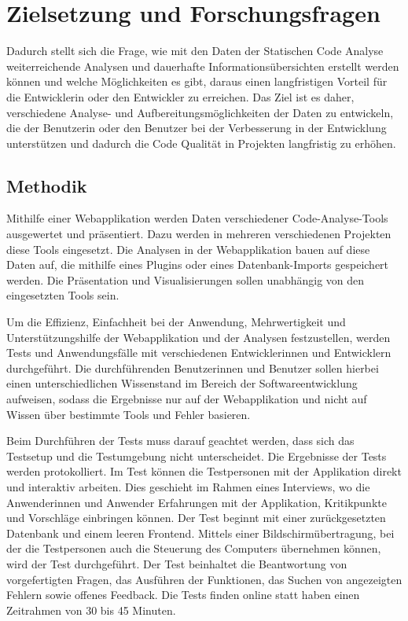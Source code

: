 \section{Zielsetzung und Forschungsfragen}

Dadurch stellt sich die Frage, wie mit den Daten der Statischen Code Analyse weiterreichende Analysen und dauerhafte Informationsübersichten erstellt werden können und welche Möglichkeiten es gibt, daraus einen langfristigen Vorteil für die Entwicklerin oder den Entwickler zu erreichen. Das Ziel ist es daher, verschiedene Analyse- und Aufbereitungsmöglichkeiten der Daten zu entwickeln, die der Benutzerin oder den Benutzer bei der Verbesserung in der Entwicklung unterstützen und dadurch die Code Qualität in Projekten langfristig zu erhöhen.

\subsection{Methodik} 

Mithilfe einer Webapplikation werden Daten verschiedener Code-Analyse-Tools ausgewertet und präsentiert. Dazu werden in mehreren verschiedenen Projekten diese Tools eingesetzt. Die Analysen in der Webapplikation bauen auf diese Daten auf, die mithilfe eines Plugins oder eines Datenbank-Imports gespeichert werden. Die Präsentation und Visualisierungen sollen unabhängig von den eingesetzten Tools sein.

Um die Effizienz, Einfachheit bei der Anwendung, Mehrwertigkeit und Unterstützungshilfe der Webapplikation und der Analysen festzustellen, werden Tests und Anwendungsfälle mit verschiedenen Entwicklerinnen und Entwicklern durchgeführt. Die durchführenden Benutzerinnen und Benutzer sollen hierbei einen unterschiedlichen Wissenstand im Bereich der Softwareentwicklung aufweisen, sodass die Ergebnisse nur auf der Webapplikation und nicht auf Wissen über bestimmte Tools und Fehler basieren. 


Beim Durchführen der Tests muss darauf geachtet werden, dass sich das Testsetup und die Testumgebung nicht unterscheidet. Die Ergebnisse der Tests werden protokolliert. Im Test können die Testpersonen mit der Applikation direkt und interaktiv arbeiten. Dies geschieht im Rahmen eines Interviews, wo die Anwenderinnen und Anwender Erfahrungen mit der Applikation, Kritikpunkte und Vorschläge einbringen können. Der Test beginnt mit einer zurückgesetzten Datenbank und einem leeren Frontend. Mittels einer Bildschirmübertragung, bei der die Testpersonen auch die Steuerung des Computers übernehmen können, wird der Test durchgeführt.
Der Test beinhaltet die Beantwortung von vorgefertigten Fragen, das Ausführen der Funktionen, das Suchen von angezeigten Fehlern sowie offenes Feedback.
Die Tests finden online statt haben einen Zeitrahmen von 30 bis 45 Minuten. 
